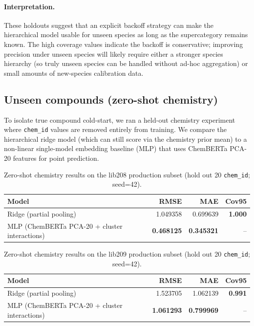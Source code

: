 \documentclass[11pt]{article}
\begin{document}
\paragraph{Interpretation.}
These holdouts suggest that an explicit backoff strategy can make the hierarchical model usable for unseen species as
long as the supercategory remains known. The high coverage values indicate the backoff is conservative; improving
precision under unseen species will likely require either a stronger species hierarchy (so truly unseen species can be
handled without ad-hoc aggregation) or small amounts of new-species calibration data.

\subsection{Unseen compounds (zero-shot chemistry)}

To isolate true compound cold-start, we ran a held-out chemistry experiment where \texttt{chem\_id} values are removed
entirely from training. We compare the hierarchical ridge model (which can still score via the chemistry prior mean) to a
non-linear single-model embedding baseline (MLP) that uses ChemBERTa PCA-20 features for point prediction.

\begin{table}[H]
\centering
\caption{Zero-shot chemistry results on the lib208 production subset (hold out 20 \texttt{chem\_id}; seed=42).}
\label{tab:zero_shot_lib208}
\begin{tabular}{lrrr}
\toprule
Model & RMSE & MAE & Cov95 \\
\midrule
Ridge (partial pooling) & 1.049358 & 0.699639 & \textbf{1.000} \\
MLP (ChemBERTa PCA-20 + cluster interactions) & \textbf{0.468125} & \textbf{0.345321} & -- \\
\bottomrule
\end{tabular}
\end{table}

\begin{table}[H]
\centering
\caption{Zero-shot chemistry results on the lib209 production subset (hold out 20 \texttt{chem\_id}; seed=42).}
\label{tab:zero_shot_lib209}
\begin{tabular}{lrrr}
\toprule
Model & RMSE & MAE & Cov95 \\
\midrule
Ridge (partial pooling) & 1.523705 & 1.062139 & \textbf{0.991} \\
MLP (ChemBERTa PCA-20 + cluster interactions) & \textbf{1.061293} & \textbf{0.799969} & -- \\
\bottomrule
\end{tabular}
\end{table}
\end{document}
